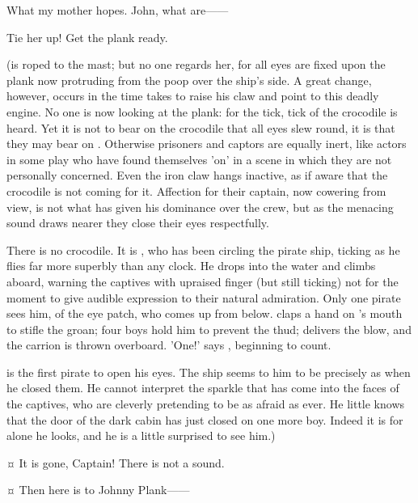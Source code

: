 \begin{drama}
\firsttwinspeaks
What my mother hopes.
John, what are——

\hookspeaks
Tie her up!
Get the plank ready.

\begin{stagedir}
(\wendy is roped to the mast;
but no one regards her, for all eyes are fixed upon the plank now protruding from the poop over the ship's side.
A great change, however, occurs in the time \hook takes to raise his claw and point to this deadly engine.
No one is now looking at the plank: for the tick, tick of the crocodile is heard.
Yet it is not to bear on the crocodile that all eyes slew round, it is that they may bear on \hook.
Otherwise prisoners and captors are equally inert,
like actors in some play who have found themselves 'on' in a scene in which they are not personally concerned.
Even the iron claw hangs inactive, as if aware that the crocodile is not coming for it.
Affection for their captain, now cowering from view, is not what has given \hook his dominance over the crew,
but as the menacing sound draws nearer they close their eyes respectfully.

There is no crocodile.
It is \peter, who has been circling the pirate ship, ticking as he flies far more superbly than any clock.
He drops into the water and climbs aboard, warning the captives with upraised finger (but still ticking)
not for the moment to give audible expression to their natural admiration.
Only one pirate sees him,  of the eye patch, who comes up from below.
\john claps a hand on 's mouth to stifle the groan;
four boys hold him to prevent the thud;
\peter delivers the blow, and the carrion is thrown overboard.
'One!\@' says \slightly, beginning to count.

\starkey is the first pirate to open his eyes.
The ship seems to him to be precisely as when he closed them.
He cannot interpret the sparkle that has come into the faces of the captives,
who are cleverly pretending to be as afraid as ever.
He little knows that the door of the dark cabin has just closed on one more boy.
Indeed it is for \hook alone he looks, and he is a little surprised to see him.)
\end{stagedir}

\starkeyspeaks {}¤
It is gone, Captain!
There is not a sound.


\hookspeaks {}¤
Then here is to Johnny Plank——


\end{drama}
